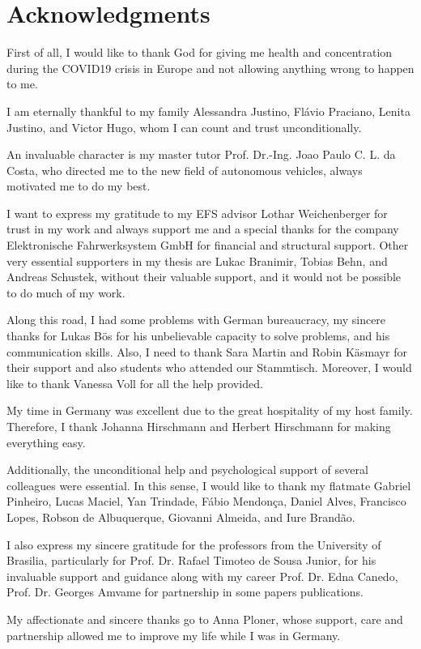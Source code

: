 \section*{Acknowledgments}
First of all, I would like to thank God for giving me health and concentration during the COVID19 crisis in Europe and not allowing anything wrong to happen to me. 

I am eternally thankful to my family Alessandra Justino, Flávio Praciano, Lenita Justino, and Victor Hugo, whom I can count and trust unconditionally.

An invaluable character is my master tutor Prof. Dr.-Ing. Joao Paulo C. L. da Costa, who directed me to the new field of autonomous vehicles, always motivated me to do my best.

I want to express my gratitude to my EFS advisor Lothar Weichenberger for trust in my work and always support me and a special thanks for the company Elektronische Fahrwerksystem GmbH for financial and structural support. Other very essential supporters in my thesis are Lukac Branimir, Tobias Behn, and Andreas Schustek, without their valuable support, and it would not be possible to do much of my work.

Along this road, I had some problems with German bureaucracy, my sincere thanks for Lukas Bös for his unbelievable capacity to solve problems, and his communication skills. Also, I need to thank Sara Martin and Robin Käsmayr for their support and also students who attended our Stammtisch. Moreover, I would like to thank Vanessa Voll for all the help provided.

My time in Germany was excellent due to the great hospitality of my host family. Therefore, I thank Johanna Hirschmann and Herbert Hirschmann for making everything easy.

Additionally, the unconditional help and psychological support of several colleagues were essential. In this sense, I would like to thank my flatmate Gabriel Pinheiro, Lucas Maciel, Yan Trindade, Fábio Mendonça, Daniel Alves, Francisco Lopes, Robson de Albuquerque, Giovanni Almeida, and Iure Brandão.

I also express my sincere gratitude for the professors from the University of Brasilia, particularly for Prof. Dr. Rafael Timoteo de Sousa Junior, for his invaluable support and guidance along with my career Prof. Dr. Edna Canedo, Prof. Dr. Georges Amvame for partnership in some papers publications.

My affectionate and sincere thanks go to Anna Ploner, whose support, care and partnership allowed me to improve my life while I was in Germany. 

